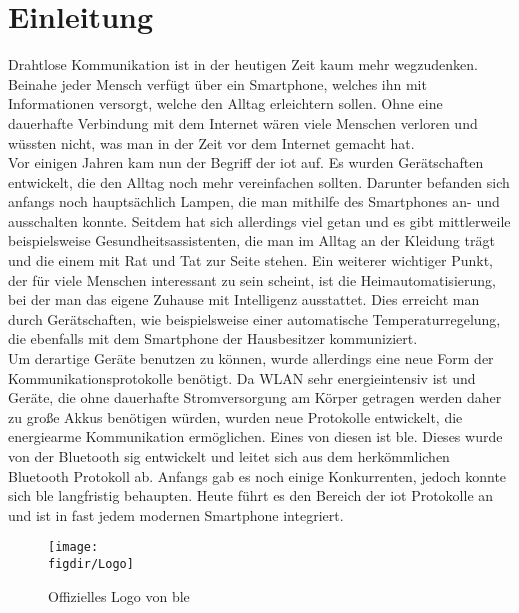 \section{Einleitung}
\label{s:intro}

Drahtlose Kommunikation ist in der heutigen Zeit kaum mehr wegzudenken. Beinahe jeder Mensch verfügt über ein Smartphone, welches ihn mit Informationen versorgt, welche den Alltag erleichtern sollen. Ohne eine dauerhafte Verbindung mit dem Internet wären viele Menschen verloren und wüssten nicht, was man in der Zeit vor dem Internet gemacht hat.\\

\noindent Vor einigen Jahren kam nun der Begriff der \ac{iot} auf. Es wurden Gerätschaften entwickelt, die den Alltag noch mehr vereinfachen sollten. Darunter befanden sich anfangs noch hauptsächlich Lampen, die man mithilfe des Smartphones an- und ausschalten konnte. Seitdem hat sich allerdings viel getan und es gibt mittlerweile beispielsweise Gesundheitsassistenten, die man im Alltag an der Kleidung trägt und die einem mit Rat und Tat zur Seite stehen. Ein weiterer wichtiger Punkt, der für viele Menschen interessant zu sein scheint, ist die Heimautomatisierung, bei der man das eigene Zuhause mit Intelligenz ausstattet. Dies erreicht man durch Gerätschaften, wie beispielsweise einer automatische Temperaturregelung, die ebenfalls mit dem Smartphone der Hausbesitzer kommuniziert.\\

\noindent Um derartige Geräte benutzen zu können, wurde allerdings eine neue Form der Kommunikationsprotokolle benötigt. Da WLAN sehr energieintensiv ist und Geräte, die ohne dauerhafte Stromversorgung am Körper getragen werden daher zu große Akkus benötigen würden, wurden neue Protokolle entwickelt, die energiearme Kommunikation ermöglichen. Eines von diesen ist \ac{ble}. Dieses wurde von der Bluetooth \ac{sig} entwickelt und leitet sich aus dem herkömmlichen Bluetooth Protokoll ab. Anfangs gab es noch einige Konkurrenten, jedoch konnte sich \ac{ble} langfristig behaupten. Heute führt es den Bereich der \ac{iot} Protokolle an und ist in fast jedem modernen Smartphone integriert.\\

\begin{figure}[h]
	\centering
	\texttt{[image: \\figdir/Logo]}
	\caption{Offizielles Logo von \ac{ble} \cite{BLE:WWW}}
	\label{FIG:logo}
\end{figure}

